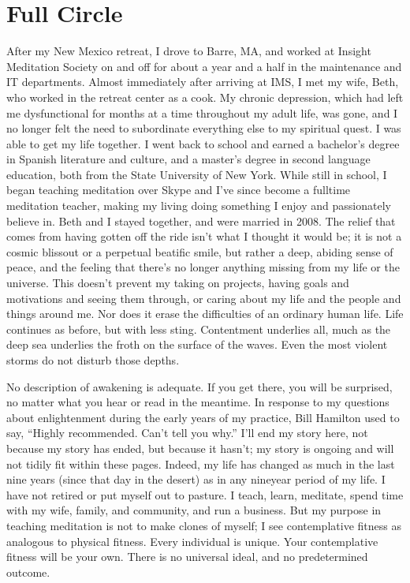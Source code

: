 \documentclass[a5paper,10pt,english]{book}
\begin{document}
\section{Full Circle}
\label{\detokenize{main-1:full-circle}}
\sphinxAtStartPar
After my New Mexico retreat, I drove to Barre, MA, and worked at Insight
Meditation Society on and off for about a year and a half in the
maintenance and IT departments. Almost immediately after arriving at
IMS, I met my wife, Beth, who worked in the retreat center as a cook. My
chronic depression, which had left me dysfunctional for months at a time
throughout my adult life, was gone, and I no longer felt the need to
subordinate everything else to my spiritual quest. I was able to get my
life together. I went back to school and earned a bachelor’s degree in
Spanish literature and culture, and a master’s degree in second language
education, both from the State University of New York. While still in
school, I began teaching meditation over Skype and I’ve since become a
full\sphinxhyphen{}time meditation teacher, making my living doing something I enjoy
and passionately believe in. Beth and I stayed together, and were
married in 2008. The relief that comes from having gotten off the ride
isn’t what I thought it would be; it is not a cosmic bliss\sphinxhyphen{}out or a
perpetual beatific smile, but rather a deep, abiding sense of peace, and
the feeling that there’s no longer anything missing from my life or the
universe. This doesn’t prevent my taking on projects, having goals and
motivations and seeing them through, or caring about my life and the
people and things around me. Nor does it erase the difficulties of an
ordinary human life. Life continues as before, but with less sting.
Contentment underlies all, much as the deep sea underlies the froth on
the surface of the waves. Even the most violent storms do not disturb
those depths.

\sphinxAtStartPar
No description of awakening is adequate. If you get there, you will be
surprised, no matter what you hear or read in the meantime. In response
to my questions about enlightenment during the early years of my
practice, Bill Hamilton used to say, “Highly recommended. Can’t tell you
why.” I’ll end my story here, not because my story has ended, but
because it hasn’t; my story is ongoing and will not tidily fit within
these pages. Indeed, my life has changed as much in the last nine years
(since that day in the desert) as in any nine\sphinxhyphen{}year period of my life. I
have not retired or put myself out to pasture. I teach, learn, meditate,
spend time with my wife, family, and community, and run a business. But
my purpose in teaching meditation is not to make clones of myself; I see
contemplative fitness as analogous to physical fitness. Every individual
is unique. Your contemplative fitness will be your own. There is no
universal ideal, and no predetermined outcome.
\end{document}
